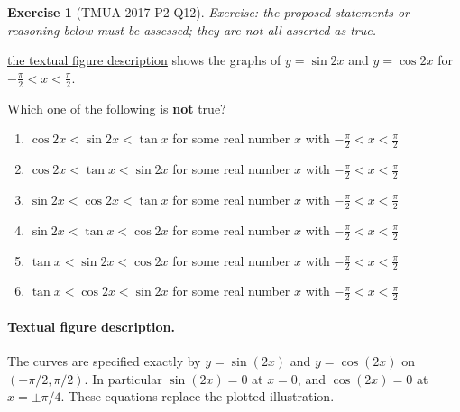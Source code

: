 \documentclass[11pt]{article}
\theoremstyle{definition}
\newtheorem{example}[theorem]{Exercise}
\theoremstyle{remark}
\begin{document}
\begin{example}[TMUA 2017 P2 Q12]\label{tmua-2-unit-026}
\textit{Exercise: the proposed statements or reasoning below must be assessed; they are not all asserted as true.}\par

    \hyperref[fig:tmua-2017-p2-q12]{the textual figure description} shows the graphs of \(y = \sin 2x\) and \(y = \cos 2x\) for \(- \frac{\pi}{2} < x < \frac{\pi}{2}\).

    Which one of the following is \textbf{not} true?
    
    \begin{enumerate}
        \item \(\cos 2x < \sin 2x < \tan x\) for some real number \(x\) with \(- \frac{\pi}{2} < x < \frac{\pi}{2}\)
        \item \(\cos 2x < \tan x < \sin 2x\) for some real number \(x\) with \(- \frac{\pi}{2} < x < \frac{\pi}{2}\)
        \item \(\sin 2x < \cos 2x < \tan x\) for some real number \(x\) with \(- \frac{\pi}{2} < x < \frac{\pi}{2}\)
        \item \(\sin 2x < \tan x < \cos 2x\) for some real number \(x\) with \(- \frac{\pi}{2} < x < \frac{\pi}{2}\)
        \item \(\tan x < \sin 2x < \cos 2x\) for some real number \(x\) with \(- \frac{\pi}{2} < x < \frac{\pi}{2}\)
        \item \(\tan x < \cos 2x < \sin 2x\) for some real number \(x\) with \(- \frac{\pi}{2} < x < \frac{\pi}{2}\)
    \end{enumerate}
\end{example}

\paragraph{Textual figure description.}\label{fig:tmua-2017-p2-q12}
The curves are specified exactly by \(y=\sin(2x)\) and \(y=\cos(2x)\) on \((-\pi/2,\pi/2)\). In particular \(\sin(2x)=0\) at \(x=0\), and \(\cos(2x)=0\) at \(x=\pm\pi/4\). These equations replace the plotted illustration.
\end{document}
